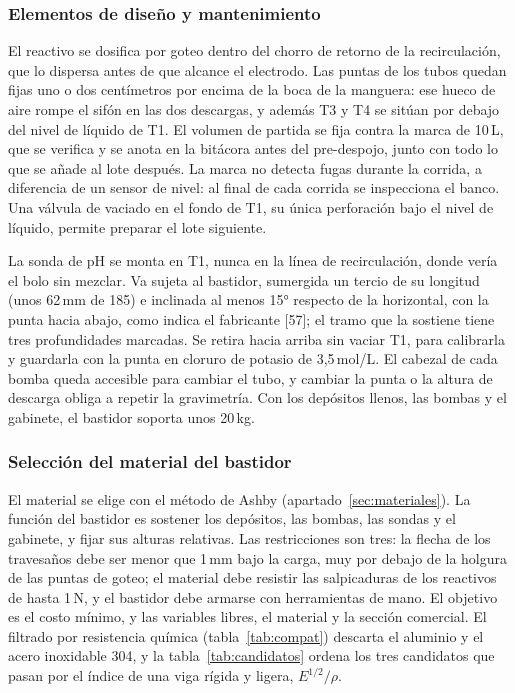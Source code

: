 \subsubsection{Elementos de diseño y mantenimiento}\label{sec:elementos}
El reactivo se dosifica por goteo dentro del chorro de retorno de la recirculación, que lo dispersa antes de que alcance el electrodo. Las puntas de los tubos quedan fijas uno o dos centímetros por encima de la boca de la manguera: ese hueco de aire rompe el sifón en las dos descargas, y además T3 y T4 se sitúan por debajo del nivel de líquido de T1. El volumen de partida se fija contra la marca de 10\,L, que se verifica y se anota en la bitácora antes del pre-despojo, junto con todo lo que se añade al lote después. La marca no detecta fugas durante la corrida, a diferencia de un sensor de nivel: al final de cada corrida se inspecciona el banco. Una válvula de vaciado en el fondo de T1, su única perforación bajo el nivel de líquido, permite preparar el lote siguiente.

La sonda de pH se monta en T1, nunca en la línea de recirculación, donde vería el bolo sin mezclar. Va sujeta al bastidor, sumergida un tercio de su longitud (unos 62\,mm de 185) e inclinada al menos 15° respecto de la horizontal, con la punta hacia abajo, como indica el fabricante [57]; el tramo que la sostiene tiene tres profundidades marcadas. Se retira hacia arriba sin vaciar T1, para calibrarla y guardarla con la punta en cloruro de potasio de 3,5\,mol/L. El cabezal de cada bomba queda accesible para cambiar el tubo, y cambiar la punta o la altura de descarga obliga a repetir la gravimetría. Con los depósitos llenos, las bombas y el gabinete, el bastidor soporta unos 20\,kg.

\subsubsection{Selección del material del bastidor}\label{sec:bastidor}
El material se elige con el método de Ashby (apartado~\ref{sec:materiales}). La función del bastidor es sostener los depósitos, las bombas, las sondas y el gabinete, y fijar sus alturas relativas. Las restricciones son tres: la flecha de los travesaños debe ser menor que 1\,mm bajo la carga, muy por debajo de la holgura de las puntas de goteo; el material debe resistir las salpicaduras de los reactivos de hasta 1\,N, y el bastidor debe armarse con herramientas de mano. El objetivo es el costo mínimo, y las variables libres, el material y la sección comercial. El filtrado por resistencia química (tabla~\ref{tab:compat}) descarta el aluminio y el acero inoxidable 304, y la tabla~\ref{tab:candidatos} ordena los tres candidatos que pasan por el índice de una viga rígida y ligera, $E^{1/2}/\rho$.

